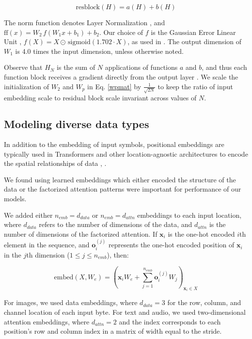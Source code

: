\begin{equation}\mathrm{resblock}(H) = a(H) + b(H) \end{equation}

The $\mathrm{norm}$ function denotes Layer Normalization \cite{ba2016layer}, and $\mathrm{ff}(x) = W_2 \, f(W_1x + b_1) + b_2$. Our choice of $f$ is the Gaussian Error Linear Unit \cite{hendrycks2016bridging}, $f(X) = X \odot \, \mathrm{sigmoid}(1.702 \cdot X)$, as used in \cite{radford2018}. The output dimension of $W_1$ is 4.0 times the input dimension, unless otherwise noted.

Observe that $H_N$ is the sum of $N$ applications of functions $a$ and $b$, and thus each function block receives a gradient directly from the output layer . We scale the initialization of $W_2$ and $W_p$ in Eq. \ref{wpmat} by $\frac{1}{\sqrt{2N}}$ to keep the ratio of input embedding scale to residual block scale invariant across values of $N$. 

\subsection{Modeling diverse data types} In addition to the embedding of input symbols, positional embeddings are typically used in Transformers and other location-agnostic architectures to encode the spatial relationships of data \cite{gehring2017convolutional}, \cite{parmar2018image}.

We found using learned embeddings which either encoded the structure of the data or the factorized attention patterns were important for performance of our models. 

We added either $n_{emb} = d_{data}$ or $n_{emb} = d_{attn}$ embeddings to each input location, where $d_{data}$ refers to the number of dimensions of the data, and $d_{attn}$ is the number of dimensions of the factorized attention. If $\mathbf{x}_i$ is the one-hot encoded $i$th element in the sequence, and $\mathbf{o}_{i}^{(j)}$ represents the one-hot encoded position of $\mathbf{x}_i$ in the $j$th dimension ($1 \le j \le n_{emb}$), then:

\begin{equation}
\mathrm{embed}(X, W_e) = \left(\mathbf{x}_iW_e + \sum_{j=1}^{n_{emb}} \mathbf{o}_{i}^{(j)} W_{j} \right)_{\mathbf{x}_i \in X}
\end{equation}

For images, we used data embeddings, where $d_{data} = 3$ for the row, column, and channel location of each input byte. For text and audio, we used two-dimensional attention embeddings, where $d_{attn} = 2$ and the index corresponds to each position's row and column index in a matrix of width equal to the stride.

